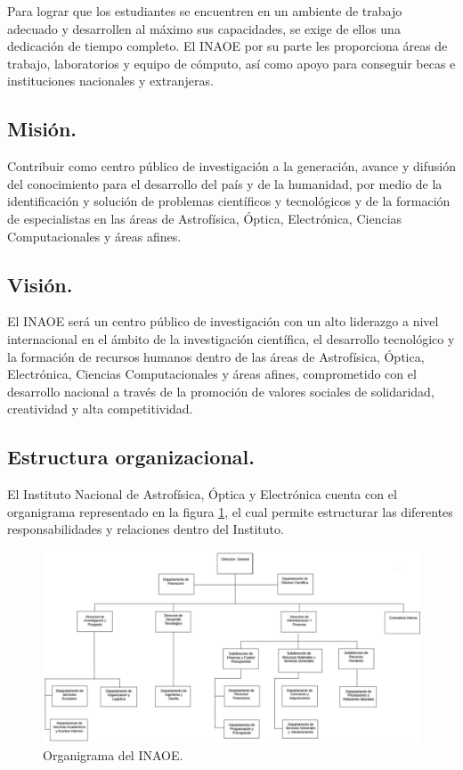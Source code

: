 Para lograr que los estudiantes se encuentren en un ambiente de trabajo adecuado y desarrollen al máximo sus capacidades, se exige de ellos una dedicación de tiempo completo. El INAOE por su parte les proporciona áreas de trabajo, laboratorios y equipo de cómputo, así como apoyo para conseguir becas e instituciones nacionales y extranjeras.

\subsection{Misión.}
Contribuir como centro público de investigación a la generación, avance y difusión del conocimiento para el desarrollo del país y de la humanidad, por medio de la identificación y solución de problemas científicos y tecnológicos y de la formación de especialistas en las áreas de Astrofísica, Óptica, Electrónica, Ciencias Computacionales y áreas afines.
 
\subsection{Visión.}
El INAOE será un centro público de investigación con un alto liderazgo a nivel internacional en el ámbito de la investigación científica, el desarrollo tecnológico y la formación de recursos humanos dentro de las áreas de Astrofísica, Óptica, Electrónica, Ciencias Computacionales y áreas afines, comprometido con el desarrollo nacional a través de la promoción de valores sociales de solidaridad, creatividad y alta competitividad.

\subsection{Estructura organizacional.}
El Instituto Nacional de Astrofísica, Óptica y Electrónica cuenta con el organigrama representado en la figura \ref{organigrama}, el cual permite estructurar las diferentes responsabilidades y relaciones dentro del Instituto. 

\begin{figure}[!h]
    \centering
    \includegraphics[width=17cm]{img/organigrama.png}
    \caption{Organigrama del INAOE.}
    \label{organigrama}
\end{figure}

